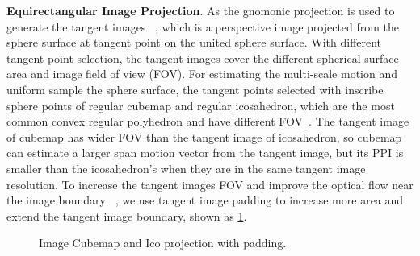 \textbf{Equirectangular Image Projection}.
As \cite{ZhaoYZLBT2020} the gnomonic projection is used to generate the tangent images ~\cite{??}, which is a perspective image projected from the sphere surface at tangent point on the united sphere surface.
With different tangent point selection, the tangent images cover the different spherical surface area and image field of view (FOV).
%
For estimating the multi-scale motion and uniform sample the sphere surface, the tangent points selected with inscribe sphere points of regular cubemap and regular icosahedron, which are the most common convex regular polyhedron and have different FOV~\cite{?}.
%
The tangent image of cubemap has wider FOV than the tangent image of icosahedron, so cubemap can estimate a larger span motion vector from the tangent image, but its PPI is smaller than the icosahedron's when they are in the same tangent image resolution.
To increase the tangent images FOV and improve the optical flow near the image boundary ~\cite{?}, we use tangent image padding to increase more area and extend the tangent image boundary, shown as \cref{fig:approach:projection}.

\begin{figure}[hbt!]
	\begin{center}
	\end{center}
	\caption{\label{fig:approach:projection}
		Image Cubemap and Ico projection with padding. }
\end{figure}

